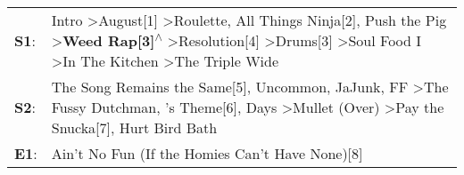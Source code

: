 \begin{supertabular}{p{0.03\textwidth}p{0.92\textwidth}}
 \textbf{S1}:  &  Intro\textsuperscript{} \textgreater \enspace August[1]\textsuperscript{} \textgreater \enspace Roulette\textsuperscript{}, \enspace All Things Ninja[2]\textsuperscript{}, \enspace Push the Pig\textsuperscript{} \textgreater \enspace \textbf{Weed Rap[3]\textsuperscript{$\wedge$}} \textgreater \enspace Resolution[4]\textsuperscript{} \textgreater \enspace Drums[3]\textsuperscript{} \textgreater \enspace Soul Food I\textsuperscript{} \textgreater \enspace In The Kitchen\textsuperscript{} \textgreater \enspace The Triple Wide\textsuperscript{}  \enspace  \\
 \textbf{S2}:  &                                                                                                           The Song Remains the Same[5]\textsuperscript{}, \enspace Uncommon\textsuperscript{}, \enspace JaJunk\textsuperscript{}, \enspace FF\textsuperscript{} \textgreater \enspace The Fussy Dutchman\textsuperscript{}, 's Theme[6]\textsuperscript{},  Days\textsuperscript{} \textgreater \enspace Mullet (Over)\textsuperscript{} \textgreater \enspace Pay the Snucka[7]\textsuperscript{}, \enspace Hurt Bird Bath\textsuperscript{}  \enspace  \\
 \textbf{E1}:  &                                                                                                                                                                                                                                                                                                                                                                                                                                                                                                   Ain't No Fun (If the Homies Can't Have None)[8]\textsuperscript{}  \enspace  \\
\end{supertabular}
